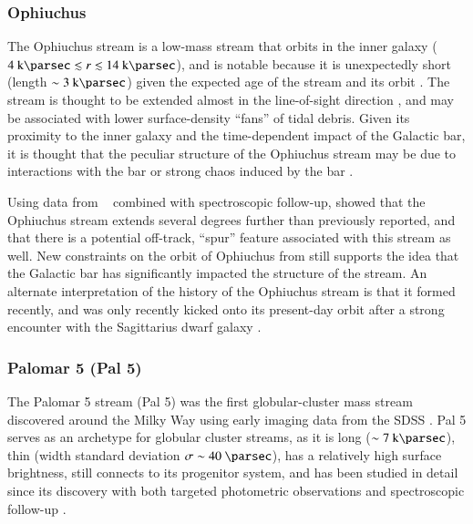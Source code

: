 \documentclass[final,5p,times,twocolumn,authoryear]{elsarticle}
\begin{document}
\subsubsection{Ophiuchus}
\label{sec:ophiuchus}

The Ophiuchus stream is a low-mass stream that orbits in the inner galaxy ($4~\kpc
\lesssim r \lesssim 14~\kpc$), and is notable because it is unexpectedly short (length
$\sim 3~\kpc$) given the expected age of the stream and its orbit \citep{bernard:2014,
sesar:2015}.
The stream is thought to be extended almost in the line-of-sight direction
\citep{sesar:2016}, and may be associated with lower surface-density ``fans'' of tidal
debris.
Given its proximity to the inner galaxy and the time-dependent impact of the Galactic
bar, it is thought that the peculiar structure of the Ophiuchus stream may be due to
interactions with the bar or strong chaos induced by the bar \citep{hattori:2016,sesar:2016,
price-whelan:2016b}.

Using data from \gaia\  combined with spectroscopic follow-up,
\citet{caldwell:2020} showed that the Ophiuchus stream extends several degrees further
than previously reported, and that there is a potential off-track, ``spur'' feature
associated with this stream as well.
New constraints on the orbit of Ophiuchus from \citet{caldwell:2020} still supports the
idea that the Galactic bar has significantly impacted the structure of the stream.
An alternate interpretation of the history of the Ophiuchus stream is that it formed
recently, and was only recently kicked onto its present-day orbit after a strong
encounter with the Sagittarius dwarf galaxy \citep{lane:2020}.


\subsubsection{Palomar 5 (Pal 5)}
\label{sec:pal5}

The Palomar 5 stream (Pal 5) was the first globular-cluster mass stream discovered
around the Milky Way using early imaging data from the SDSS \citep{odenkirchen:2001,
rockosi:2002, grillmair:2006-pal5}.
Pal 5 serves as an archetype for globular cluster streams, as it is long ($\sim
7~\kpc$), thin (width standard deviation $\sigma \sim 40~\unit{\parsec}$), has a
relatively high surface brightness, still connects to its progenitor system, and has
been studied in detail since its discovery with both targeted photometric observations
\citep{ibata:2016, bonaca:2020} and spectroscopic follow-up \citep{kuzma:2015,
ishigaki:2016, ibata:2017, kuzma:2022}.
\end{document}

